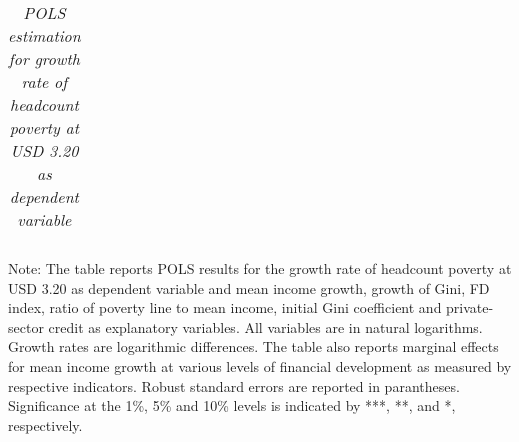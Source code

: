 \documentclass[12pt, a4paper]{article}
\begin{document}
\begin{table}[htbp]
\begin{threeparttable}
{\begin{tabular}{l*{9}{c}}
				\hline\hline
			\end{tabular}
		}
		\begin{tablenotes}
			\item \scriptsize{Note: The table reports POLS results for the growth rate of headcount poverty at USD 3.20 as dependent variable and mean income growth, growth of Gini, FD index, ratio of poverty line to mean income, initial Gini coefficient and private-sector credit as explanatory variables. All variables are in natural logarithms. Growth rates are logarithmic differences. The table also reports marginal effects for mean income growth at various levels of financial development as measured by respective indicators. Robust standard errors are reported in parantheses. Significance at the 1\%, 5\% and 10\% levels is indicated by ***, **, and *, respectively.}
		\end{tablenotes}
	\end{threeparttable}
	\caption[POLS Estimation Results for Headcount Poverty at USD 3.20]{\textit{POLS estimation for growth rate of headcount poverty at USD 3.20 as dependent variable}}
	\label{POLS320}
\end{table}
\end{document}
